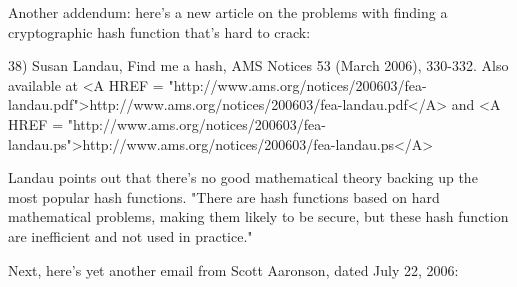 Another addendum: here's a new article on the problems with 
finding a cryptographic hash function that's hard to crack:

38) Susan Landau, Find me a hash, AMS Notices 53 (March 2006), 330-332.
Also available at <A HREF = "http://www.ams.org/notices/200603/fea-landau.pdf">http://www.ams.org/notices/200603/fea-landau.pdf</A> and
<A HREF = "http://www.ams.org/notices/200603/fea-landau.ps">http://www.ams.org/notices/200603/fea-landau.ps</A>

Landau points out that there's no good mathematical theory backing
up the most popular hash functions.  "There are hash functions 
based on hard mathematical problems, making them likely to be secure, 
but these hash function are inefficient and not used in practice."

Next, here's yet another email from Scott Aaronson, dated July 22, 2006:

